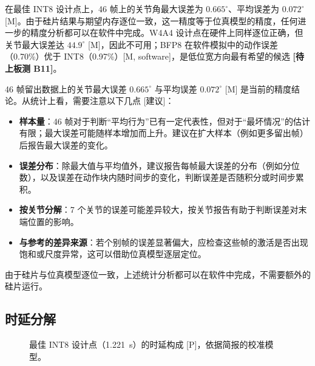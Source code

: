 \documentclass[a4paper,10.5pt]{ctexart}
\newcommand{\tM}{\textsf{[M]}}              %
\newcommand{\tP}{\textsf{[P]}}              %
\newcommand{\tMsw}{\textsf{[M, software]}}  %
\newcommand{\tR}{\textsf{[建议]}}           %
\newcommand{\tB}[1]{\textcolor{red!70!black}{\textsf{\textbf{[待上板测 #1]}}}}
\begin{document}
在最佳 INT8 设计点上，46 帧上的关节角最大误差为 $0.665^\circ$、平均误差为 $0.072^\circ$ \tM。由于硅片结果与期望内存逐位一致，这一精度等于位真模型的精度，任何进一步的精度分析都可以在软件中完成。W4A4 设计点在硬件上同样逐位正确，但关节最大误差达 $44.9^\circ$ \tM，因此不可用；BFP8 在软件模拟中的动作误差（0.70\%）优于 INT8（0.97\%）\tMsw，是低位宽方向最有希望的候选 \tB{B11}。

46 帧留出数据上的关节最大误差 $0.665^\circ$ 与平均误差 $0.072^\circ$ \tM{} 是当前的精度结论。从统计上看，需要注意以下几点 \tR：
\begin{itemize}
  \item \textbf{样本量}：46 帧对于判断“平均行为”已有一定代表性，但对于“最坏情况”的估计有限；最大误差可能随样本增加而上升。建议在扩大样本（例如更多留出帧）后报告最大误差的变化。
  \item \textbf{误差分布}：除最大值与平均值外，建议报告每帧最大误差的分布（例如分位数），以及误差在动作块内随时间步的变化，判断误差是否随积分或时间步累积。
  \item \textbf{按关节分解}：7 个关节的误差可能差异较大，按关节报告有助于判断误差对末端位置的影响。
  \item \textbf{与参考的差异来源}：若个别帧的误差显著偏大，应检查这些帧的激活是否出现饱和或尺度异常，这可以借助位真模型逐层定位。
\end{itemize}
由于硅片与位真模型逐位一致，上述统计分析都可以在软件中完成，不需要额外的硅片运行。

\subsection{时延分解}\label{sec:breakdown}

\begin{figure}[t]
\centering
{}
\caption{最佳 INT8 设计点（1.221~s）的时延构成 \tP，依据简报的校准模型。}
\label{fig:breakdown}
\end{figure}
\end{document}
